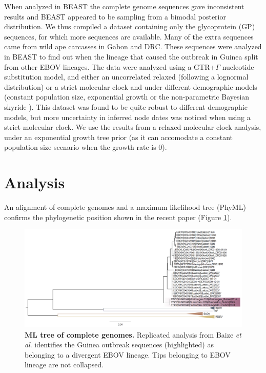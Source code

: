 \documentclass[11pt,oneside,letterpaper]{article}
\begin{document}
When analyzed in BEAST \cite{drummond2012} the complete genome sequences gave inconsistent results and BEAST appeared to be sampling from a bimodal posterior distribution.
We thus compiled a dataset containing only the glycoprotein (GP) sequences, for which more sequences are available.
Many of the extra sequences came from wild ape carcasses \cite{wittmann2007} in Gabon and DRC.
These sequences were analyzed in BEAST \cite{drummond2012} to find out when the lineage that caused the outbreak in Guinea split from other EBOV lineages.
The data were analyzed using a GTR+$\Gamma$ nucleotide substitution model, and either an uncorrelated relaxed (following a lognormal distribution) \cite{drummond2006} or a strict molecular clock and under different demographic models (constant population size, exponential growth or the non-parametric Bayesian skyride \cite{minin2008}).
This dataset was found to be quite robust to different demographic models, but more uncertainty in inferred node dates was noticed when using a strict molecular clock.
We use the results from a relaxed molecular clock analysis, under an exponential growth tree prior (as it can accomodate a constant population size scenario when the growth rate is 0).

\section*{Analysis}
An alignment of complete genomes and a maximum likelihood tree (PhyML) confirms the phylogenetic position shown in the recent paper \cite{baize2014} (Figure \ref{NEJMtree}).
\begin{figure}[h!]
\centering  
\includegraphics[width=1\textwidth]  {figures/ebolavirus_raw_ml_tree.png}
\caption{\textbf{ML tree of complete genomes.}
Replicated analysis from Baize \textit{et al}. \cite{baize2014} identifies the Guinea outbreak sequences (highlighted) as belonging to a divergent EBOV lineage.
Tips belonging to EBOV lineage are not collapsed.}
\label{NEJMtree}
\end{figure}
\end{document}
